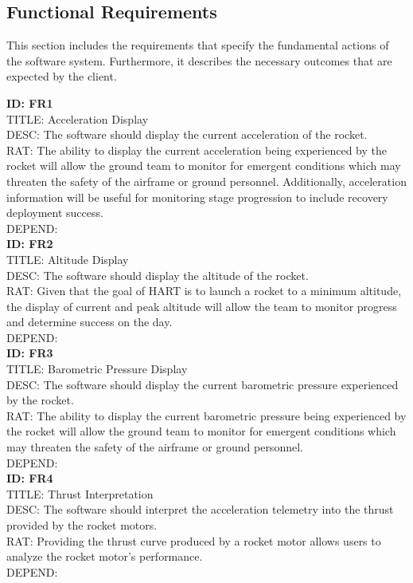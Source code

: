 \documentclass[onecolumn, draftclsnofoot,10pt, compsoc]{IEEEtran}
\begin{document}
		\subsection{Functional Requirements}
			This section includes the requirements that specify the fundamental actions of the software system. Furthermore, it describes the necessary outcomes that are expected by the client.

			\noindent
			\textbf{ID: FR1}\\
			TITLE: Acceleration Display\\
			DESC: The software should display the current acceleration of the rocket.\\
			RAT: The ability to display the current acceleration being experienced by the rocket will allow the ground team to monitor for emergent conditions which may threaten the safety of the airframe or ground personnel.
				Additionally, acceleration information will be useful for monitoring stage progression to include recovery deployment success.\\
			DEPEND: \\
			
			\noindent
			\textbf{ID: FR2}\\
			TITLE: Altitude Display\\
			DESC: The software should display the altitude of the rocket.\\
			RAT: Given that the goal of HART is to launch a rocket to a minimum altitude, the display of current and peak altitude will allow the team to monitor progress and determine success on the day.\\
			DEPEND: \\ 
			
			\noindent
			\textbf{ID: FR3}\\
			TITLE: Barometric Pressure Display\\
			DESC: The software should display the current barometric pressure experienced by the rocket.\\
			RAT: The ability to display the current barometric pressure being experienced by the rocket will allow the ground team to monitor for emergent conditions which may threaten the safety of the airframe or ground personnel.\\
			DEPEND: \\
			
			\noindent
			\textbf{ID: FR4}\\
			TITLE: Thrust Interpretation\\
			DESC: The software should interpret the acceleration telemetry into the thrust provided by the rocket motors.\\
			RAT: Providing the thrust curve produced by a rocket motor allows users to analyze the rocket motor's performance.\\
			DEPEND: \\
			
\end{document}
